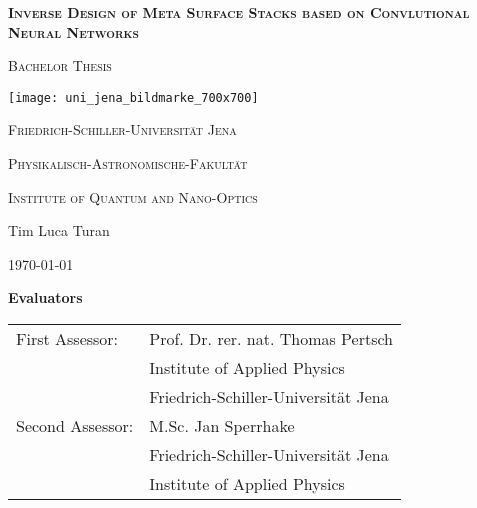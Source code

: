 \begin{titlepage}
	\centering

	{\scshape\Large \textbf{Inverse Design of Meta Surface Stacks based on Convlutional Neural Networks} \par}
	\vspace{1cm}
	{\scshape\Large Bachelor Thesis \par}
	\vspace{1.5cm}
	\texttt{[image: uni\_jena\_bildmarke\_700x700]}\par
	{\huge\bfseries \par}
	\vspace{10cm}
	{\scshape\large Friedrich-Schiller-Universität Jena\par}
	{\scshape\large Physikalisch-Astronomische-Fakultät\par}
	{\scshape\large Institute of Quantum and Nano-Optics\par}
	\vfill
	{\Large Tim Luca Turan}

	\vfill

	{\large \today\par}
\end{titlepage}

\thispagestyle{empty}
\vspace*{\fill}
\textbf{\Large Evaluators}\\[1.5cm]

\begin{tabular}{ll}
First Assessor: & Prof. Dr. rer. nat. Thomas Pertsch\\
 & Institute of Applied Physics \\
 & Friedrich-Schiller-Universität Jena \\
Second Assessor: & M.Sc. Jan Sperrhake \\
 & Friedrich-Schiller-Universität Jena \\
 & Institute of Applied Physics \\
\end{tabular}
